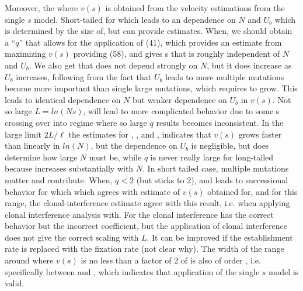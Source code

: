 \documentclass[12pt, one column]{article}
\begin{document}
Moreover, the where $v(s)$ is obtained from the velocity estimations from the single $s$ model.  Short-tailed for which leads to an dependence on $N$ and $U_b$ which is determined by  the size of, but can provide estimates.  When, we should obtain a “$q$” that allows for the application of (41), which provides an estimate  from maximizing $v(s)$ providing (58), and gives s that is roughly independent of $N$ and $U_b$.  We also get that does not depend strongly on $N$, but it does increase as $U_b$ increases, following from the fact that $U_b$ leads to more multiple mutations become more important than single large mutations, which requires to grow.  This leads to identical dependence on $N$ but weaker dependence on $U_b$ in $v(s)$.  Not so large $L=ln(Ns)$, will lead to more complicated behavior due to some s crossing over into regime where so large $q$ results becomes inconsistent.  In the large limit $2L/\ell$ the estimates for , , and , indicates that $v(s)$ grows faster than linearly in $ln(N)$, but the dependence on $U_b$ is negligible, but does determine how large $N$ must be, while $q$ is never really large for long-tailed because  increases substantially with $N$.  In short tailed case, multiple mutations matter and contribute.  When, $q<2$ (but sticks to 2), and leads to successional behavior for which which agrees with estimate of $v(s)$ obtained for, and for this range, the clonal-interference estimate agree with this result, i.e. when applying clonal interference analysis with.  
For the clonal interference has the correct behavior but the incorrect coefficient, but the application of clonal interference does not give the correct scaling with $L$.  It can be improved if the establishment rate is replaced with the fixation rate (not clear why).  The width of the range around where $v(s)$ is no less than a factor of 2 of is also of order , i.e. specifically between and , which indicates that application of the single $s$ model is valid.
\end{document}

